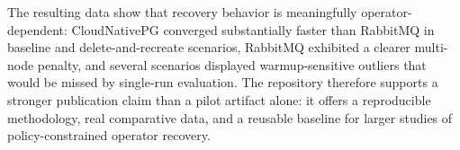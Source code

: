 \documentclass[sigconf,screen]{acmart}
\begin{document}
The resulting data show that recovery behavior is meaningfully
operator-dependent: CloudNativePG converged substantially faster than RabbitMQ
in baseline and delete-and-recreate scenarios, RabbitMQ exhibited a clearer
multi-node penalty, and several scenarios displayed warmup-sensitive outliers
that would be missed by single-run evaluation. The repository therefore
supports a stronger publication claim than a pilot artifact alone: it offers a
reproducible methodology, real comparative data, and a reusable baseline for
larger studies of policy-constrained operator recovery.

\ifacmformat

\else

\fi

\end{document}
